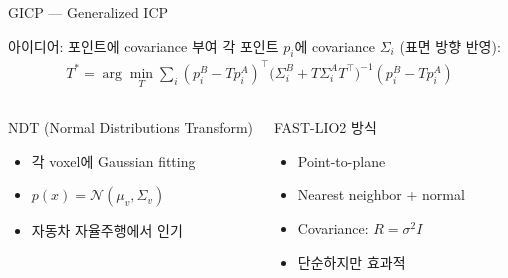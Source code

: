 \begin{frame}{GICP — Generalized ICP}
  \begin{block}{아이디어: 포인트에 covariance 부여}
    각 포인트 $p_i$에 covariance $\Sigma_i$ (표면 방향 반영):
    \begin{align*}
      T^* = \arg\min_T \sum_i (p_i^B - Tp_i^A)^\top
      \bigl(\Sigma_i^B + T\Sigma_i^A T^\top\bigr)^{-1}
      (p_i^B - Tp_i^A)
    \end{align*}
  \end{block}
  \pause
  \begin{columns}
    \begin{block}{NDT (Normal Distributions Transform)}
      \begin{itemize}
        \item 각 voxel에 Gaussian fitting
        \item $p(x) = \mathcal{N}(\mu_v, \Sigma_v)$
        \item 자동차 자율주행에서 인기
      \end{itemize}
    \end{block}
    \begin{block}{FAST-LIO2 방식}
      \begin{itemize}
        \item Point-to-plane
        \item Nearest neighbor + normal
        \item Covariance: $R = \sigma^2 I$
        \item 단순하지만 효과적
      \end{itemize}
    \end{block}
  \end{columns}
\end{frame}


